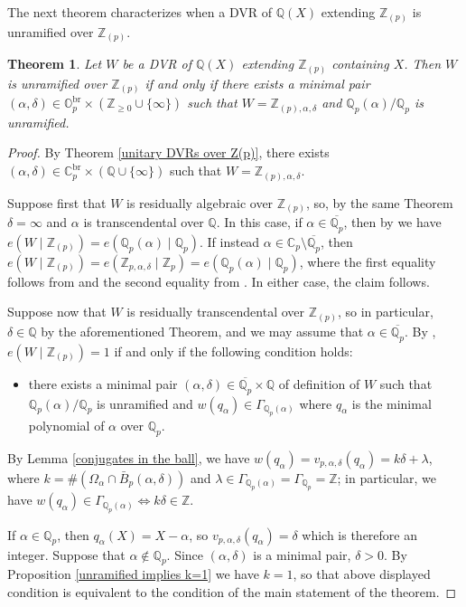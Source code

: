 \documentclass[10pt]{article}
\numberwithin{equation}{section}
\newtheorem{Thm}[equation]{Theorem}
\theoremstyle{definition}
\theoremstyle{definition}
\newcommand{\Q}{\mathbb{Q}}
\newcommand{\Z}{\mathbb{Z}}
\newcommand{\C}{\mathbb{C}}
\renewcommand{\O}{\mathbb{O}}
\newcommand{\oQp}{\overline{\Q_p}}
\newcommand{\br}{\text{br}}
\begin{document}
The next theorem characterizes when a DVR of $\Q(X)$ extending $\Z_{(p)}$ is unramified over $\Z_{(p)}$.

\begin{Thm}\label{unramified DVR over Zp}
Let $W$ be a DVR of $\Q(X)$ extending $\Z_{(p)}$ containing $X$. Then $W$ is unramified over $\Z_{(p)}$ if and only if there exists a minimal pair $(\alpha,\delta)\in\O_p^{\br}\times(\Z_{\geq0}\cup\{\infty\})$ such that $W= \Z_{(p), \alpha, \delta}$ and  $\Q_p(\alpha)/\Q_p$ is unramified.
\end{Thm}
\begin{proof}
By Theorem \ref{unitary DVRs over Z(p)}, there exists $(\alpha,\delta)\in\C_p^{\br}\times(\Q\cup\{\infty\})$ such that $W=\Z_{(p),\alpha,\delta}$. 

Suppose first that $W$ is residually algebraic over $\Z_{(p)}$, so, by the same Theorem $\delta=\infty$ and $\alpha$ is transcendental over $\Q$. In this case, if $\alpha\in\oQp$, then by \cite[Proposition 2.2]{PerTransc} we have $e(W\mid\Z_{(p)})=e(\Q_p(\alpha)\mid\Q_p)$. If instead $\alpha\in\C_p\setminus\oQp$, then  $e(W\mid\Z_{(p)})=e(\Z_{p,\alpha,\delta}\mid\Z_p)=e(\Q_p(\alpha)\mid\Q_p)$, where the first equality follows from  \cite[Proposition 2.24]{PerStacked} and the second equality from \cite[Proposition 2.14]{PerStacked}. In either case, the claim follows. 

Suppose now that $W$ is residually transcendental over $\Z_{(p)}$, so in particular, $\delta\in\Q$ by the aforementioned Theorem,  and we may assume that $\alpha\in\oQp$. By \cite[Theorem 2.1]{APZTheorem}, $e(W\mid\Z_{(p)})=1$ if and only if the following condition holds:
\begin{itemize}
\item[] there exists a minimal pair $(\alpha,\delta)\in\oQp\times\Q$ of definition of $W$ such that $\Q_p(\alpha)/\Q_p$ is unramified and $w(q_{\alpha})\in\Gamma_{\Q_p(\alpha)}$ where $q_{\alpha}$ is the minimal polynomial of $\alpha$ over $\Q_p$.
\end{itemize} 
By Lemma \ref{conjugates in the ball}, we have $w(q_{\alpha})=v_{p,\alpha,\delta}(q_{\alpha})=k\delta+\lambda$, where $k=\#(\Omega_{\alpha}\cap \bar B_p(\alpha,\delta))$ and $\lambda\in \Gamma_{\Q_p(\alpha)}=\Gamma_{\Q_p}=\Z$; in particular, we have $w(q_{\alpha})\in\Gamma_{\Q_p(\alpha)}\Leftrightarrow k\delta\in\Z$.

If $\alpha\in\Q_p$, then $q_{\alpha}(X)=X-\alpha$, so $v_{p,\alpha,\delta}(q_{\alpha})=\delta$ which is therefore an integer.
Suppose that $\alpha\not\in\Q_p$. Since $(\alpha,\delta)$ is  a minimal pair, $\delta>0$. By Proposition \ref{unramified implies k=1} we have $k=1$, so that above displayed condition is equivalent to the condition of the main statement of the theorem.
\end{proof}
\end{document}
